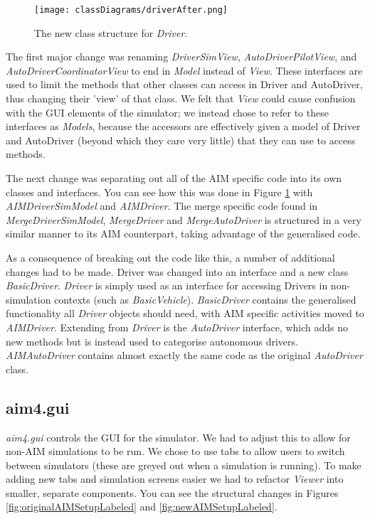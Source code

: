 \begin{figure}[htb]
\texttt{[image: classDiagrams/driverAfter.png]}
\caption{The new class structure for \emph{Driver}.}
\label{fig:driverAfter}
\end{figure}

The first major change was renaming \emph{DriverSimView}, \emph{AutoDriverPilotView}, and \emph{AutoDriverCoordinatorView} to end in \emph{Model} instead of \emph{View}. These interfaces are used to limit the methods that other classes can access in Driver and AutoDriver, thus changing their 'view' of that class. We felt that \emph{View} could cause confusion with the GUI elements of the simulator; we instead chose to refer to these interfaces as \emph{Models}, because the accessors are effectively given a model of Driver and AutoDriver (beyond which they care very little) that they can use to access methods.

The next change was separating out all of the AIM specific code into its own classes and interfaces. You can see how this was done in Figure \ref{fig:driverAfter} with \emph{AIMDriverSimModel} and \emph{AIMDriver}. The merge specific code found in \emph{MergeDriverSimModel}, \emph{MergeDriver} and \emph{MergeAutoDriver} is structured in a very similar manner to its AIM counterpart, taking advantage of the generalised code.

As a consequence of breaking out the code like this, a number of additional changes had to be made. Driver was changed into an interface and a new class \emph{BasicDriver}. \emph{Driver} is simply used as an interface for accessing Drivers in non-simulation contexts (such as \emph{BasicVehicle}). \emph{BasicDriver} contains the generalised functionality all \emph{Driver} objects should need, with AIM specific activities moved to \emph{AIMDriver}. Extending from \emph{Driver} is the \emph{AutoDriver} interface, which adds no new methods but is instead used to categorise autonomous drivers. \emph{AIMAutoDriver} contains almost exactly the same code as the original \emph{AutoDriver} class.

\subsection{aim4.gui}
\label{subsec:aim4.gui}
\emph{aim4.gui} controls the GUI for the simulator. We had to adjust this to allow for non-AIM simulations to be run. We chose to use tabs to allow users to switch between simulators (these are greyed out when a simulation is running). To make adding new tabs and simulation screens easier we had to refactor \emph{Viewer} into smaller, separate components. You can see the structural changes in Figures \ref{fig:originalAIMSetupLabeled} and \ref{fig:newAIMSetupLabeled}.

